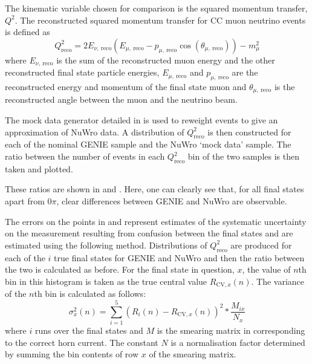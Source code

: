 The kinematic variable chosen for comparison is the squared momentum transfer, $Q^{2}$.
The reconstructed squared momentum transfer for CC muon neutrino events is defined as
\begin{equation}
Q^{2}_{\textrm{reco}} = 2E_{\nu,~\textrm{reco}} \left( E_{\mu,~\textrm{reco}} - p_{\mu,~\textrm{reco}} \cos \left( \theta_{\mu,~\textrm{reco}} \right) \right) - m_{\mu}^{2}
\end{equation}
where $E_{\nu,~\textrm{reco}}$ is the sum of the reconstructed muon energy and the other reconstructed final state particle energies, $E_{\mu,~\textrm{reco}}$ and $p_{\mu,~\textrm{reco}}$ are the reconstructed energy and momentum of the final state muon and $\theta_{\mu,~\textrm{reco}}$ is the reconstructed angle between the muon and the neutrino beam.

The mock data generator detailed in  is used to reweight events to give an approximation of NuWro data.
A distribution of $Q^{2}_{\textrm{reco}}$ is then constructed for each of the nominal GENIE sample and the NuWro `mock data' sample. 
The ratio between the number of events in each $Q^{2}_{\textrm{reco}}$ bin of the two samples is then taken and plotted. 

These ratios are shown in  and . 
Here, one can clearly see that, for all final states apart from $0\pi$, clear differences between GENIE and NuWro are observable.

The errors on the points in  and  represent estimates of the systematic uncertainty on the measurement resulting from confusion between the final states and are estimated using the following method.
Distributions of $Q^{2}_{\textrm{reco}}$ are produced for each of the $i$ true final states for GENIE and NuWro and then the ratio between the two is calculated as before.
For the final state in question, $x$, the value of $n$th bin in this histogram is taken as the true central value $R_{\textrm{CV}, x}(n)$.
The variance of the $n$th bin is calculated as follows:
\begin{equation}
	\sigma_{x}^{2}(n) = \sum_{i=1}^{5} \left( R_{i}(n) - R_{\textrm{CV}, x}(n) \right)^{2} * \frac{M_{i x}}{N_{x}}
\end{equation}
where $i$ runs over the final states and $M$ is the smearing matrix in  corresponding to the correct horn current.
The constant $N$ is a normalisation factor determined by summing the bin contents of row $x$ of the smearing matrix. 

